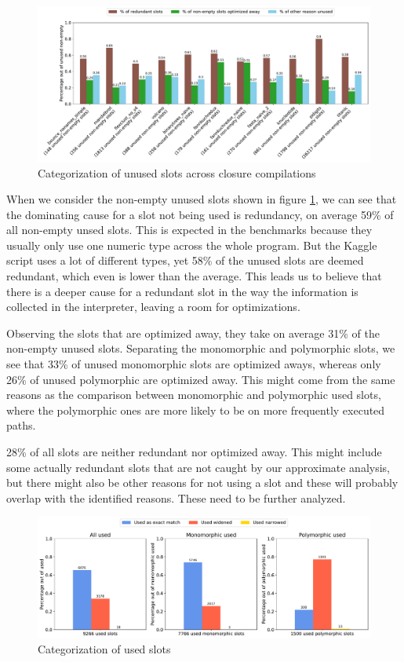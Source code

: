 \begin{figure}[t]
	\centering
	\begin{adjustwidth}{-3cm}{-3cm}
		\includegraphics[width=1.5\textwidth]{figures/unused.pdf}
	\end{adjustwidth}
	\caption{Categorization of unused slots across closure compilations}\label{fig:graph-unused}
\end{figure}

When we consider the non-empty unused slots shown in figure \ref{fig:graph-unused}, we can see that the dominating cause for a slot not being used is redundancy, on average 59\% of all non-empty unsed slots. This is expected in the benchmarks because they usually only use one numeric type across the whole program. But the Kaggle script uses a lot of different types, yet 58\% of the unused slots are deemed redundant, which even is lower than the average. This leads us to believe that there is a deeper cause for a redundant slot in the way the information is collected in the interpreter, leaving a room for optimizations.

Observing the slots that are optimized away, they take on average 31\% of the non-empty unused slots. Separating the monomorphic and polymorphic slots, we see that 33\% of unused monomorphic slots are optimized aways, whereas only 26\% of unused polymorphic are optimized away. This might come from the same reasons as the comparison between monomorphic and polymorphic used slots, where the polymorphic ones are more likely to be on more frequently executed paths.

28\% of all slots are neither redundant nor optimized away. This might include some actually redundant slots that are not caught by our approximate analysis, but there might also be other reasons for not using a slot and these will probably overlap with the identified reasons. These need to be further analyzed.

\begin{figure}[t]
	\centering
	\includegraphics[width=\textwidth]{figures/used_all.pdf}
	\caption{Categorization of used slots}\label{fig:graph-used}
\end{figure}

